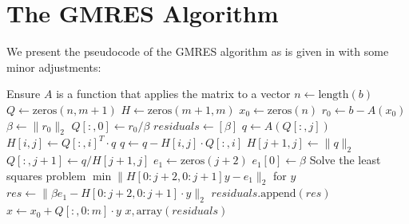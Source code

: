 \section{The GMRES Algorithm}

We present the pseudocode of the GMRES algorithm as is given in \citet{arnoldi2025lab} with some minor adjustments:

\begin{algorithm}[H]
    \begin{algorithmic}
        \State Ensure $A$ is a function that applies the matrix to a vector
        \State$n\gets\text{length}(b)$
        \State$Q\gets\text{zeros}(n,m+1)$
        \State$H\gets\text{zeros}(m+1,m)$
        \State$x_0\gets\text{zeros}(n)$
        \State$r_0\gets b-A(x_0)$
        \State$\beta\gets\|r_0\|_2$
        \State$Q[:,0]\gets r_0/\beta$
        \State$residuals\gets[\beta]$
        \State$q\gets A(Q[:,j])$
        \State$H[i,j]\gets Q[:,i]^T\cdot q$
        \State$q\gets q-H[i,j]\cdot Q[:,i]$
        \EndFor
        \State$H[j+1,j]\gets\|q\|_2$
        \State$Q[:,j+1]\gets q/H[j+1,j]$
        \EndIf
        \State$e_1\gets\text{zeros}(j+2)$
        \State$e_1[0]\gets\beta$
        \State Solve the least squares problem $\min\|H[0:j+2,0:j+1]y-e_1\|_2$ for $y$
        \State$res\gets\|\beta e_1-H[0:j+2,0:j+1]\cdot y\|_2$
        \State$residuals.\text{append}(res)$
        \EndFor
        \State$x\gets x_0+Q[:,0:m]\cdot y$
        \State\Return$x,\text{array}(residuals)$
        \EndProcedure
    \end{algorithmic}
\end{algorithm}
